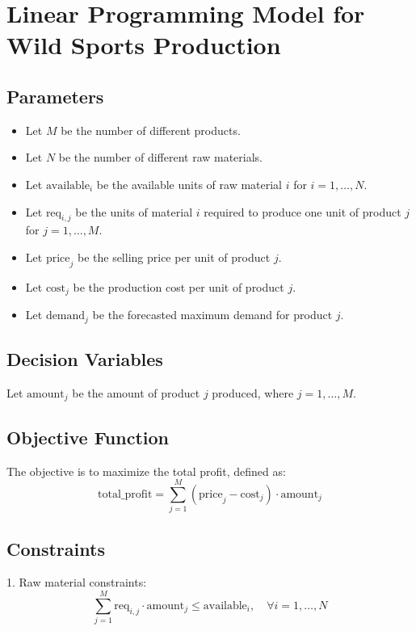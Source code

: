 \documentclass{article}
\begin{document}
\section*{Linear Programming Model for Wild Sports Production}

\subsection*{Parameters}
\begin{itemize}
    \item Let \( M \) be the number of different products.
    \item Let \( N \) be the number of different raw materials.
    \item Let \( \text{available}_i \) be the available units of raw material \( i \) for \( i = 1, \ldots, N \).
    \item Let \( \text{req}_{i,j} \) be the units of material \( i \) required to produce one unit of product \( j \) for \( j = 1, \ldots, M \).
    \item Let \( \text{price}_j \) be the selling price per unit of product \( j \).
    \item Let \( \text{cost}_j \) be the production cost per unit of product \( j \).
    \item Let \( \text{demand}_j \) be the forecasted maximum demand for product \( j \).
\end{itemize}

\subsection*{Decision Variables}
Let \( \text{amount}_j \) be the amount of product \( j \) produced, where \( j = 1, \ldots, M \).

\subsection*{Objective Function}
The objective is to maximize the total profit, defined as:
\[
\text{total\_profit} = \sum_{j=1}^{M} (\text{price}_j - \text{cost}_j) \cdot \text{amount}_j
\]

\subsection*{Constraints}
1. Raw material constraints:
\[
\sum_{j=1}^{M} \text{req}_{i,j} \cdot \text{amount}_j \leq \text{available}_i, \quad \forall i = 1, \ldots, N
\]
\end{document}
